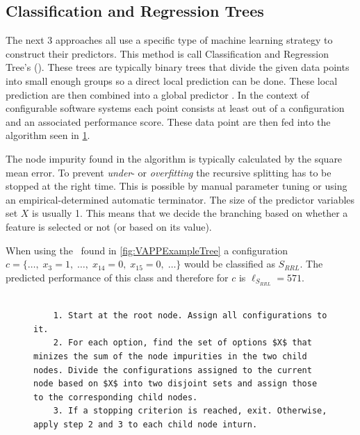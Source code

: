 \subsection{Classification and Regression Trees}
\label{sec:CART}
The next 3 approaches all use a specific type of machine learning strategy to construct their predictors. This method is call Classification and Regression Tree's (\CART). These trees are typically binary trees that divide the given data points into small enough groups so a direct local prediction can be done. These local prediction are then combined into a global predictor \cite{VariabilityAwarePerformancePredictionJianmeiSigmundApel}. In the context of configurable software systems each point consists at least out of a configuration and an associated performance score. These data point are then fed into the algorithm seen in \cref{alg:CART}.


The node impurity found in the algorithm is typically calculated by the square mean error. To prevent \textit{under}- or \textit{overfitting}\cite{ElementsOfStatisticalLearning} the recursive splitting has to be stopped at the right time. This is possible by manual parameter tuning or using an empirical-determined automatic terminator. The size of the predictor variables set $X$ is usually 1. This means that we decide the branching based on whether a feature is selected or not (or based on its value).

When using the \CART~found in \cref{fig:VAPPExampleTree} a configuration $c=\{\dots,\;x_3=1,\;\dots,\;x_{14}=0,\;x_{15}=0,\;\dots\}$ would be classified as $S_{RRL}$. The predicted performance of this class and therefore for $c$ is $\ell_{S_{RRL}}=571$.
\\\\
\begin{figure}[h]
	\lstset{
		mathescape,
		breaklines=true,
	}
	\begin{lstlisting}
	1. Start at the root node. Assign all configurations to it.
	2. For each option, find the set of options $X$ that minizes the sum of the node impurities in the two child nodes. Divide the configurations assigned to the current node based on $X$ into two disjoint sets and assign those to the corresponding child nodes.
	3. If a stopping criterion is reached, exit. Otherwise, apply step 2 and 3 to each child node inturn.
	\end{lstlisting}
	\label{alg:CART}
\end{figure}

